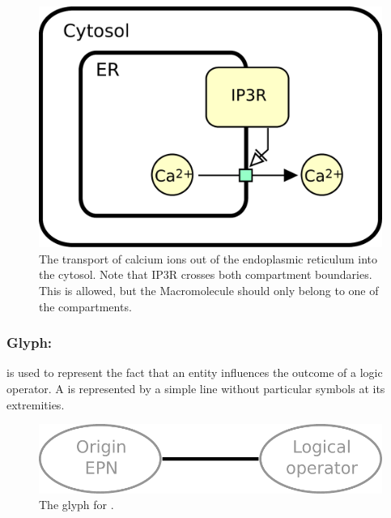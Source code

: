 \begin{figure}[htb]
  \centering
  \includegraphics[scale = 0.5]{le_images/necessary_stim-transport}
  \caption{The transport of calcium ions out of the endoplasmic reticulum into the cytosol. Note that IP3R crosses both compartment boundaries. This is allowed, but the Macromolecule should only belong to one of the compartments.}
  \label{fig:necessary_stim-calcium}
\end{figure}


\subsubsection{Glyph:  }\label{sec:logicArc}

 is used to represent the fact that an entity influences the outcome of a logic operator. A  is represented by a simple line without particular symbols at its extremities.

\begin{figure}[htb]
  \centering
  \includegraphics[scale = 0.4]{le_images/logicArc}
  \caption{The \PD glyph for .}
  \label{fig:logicArc}
\end{figure}

